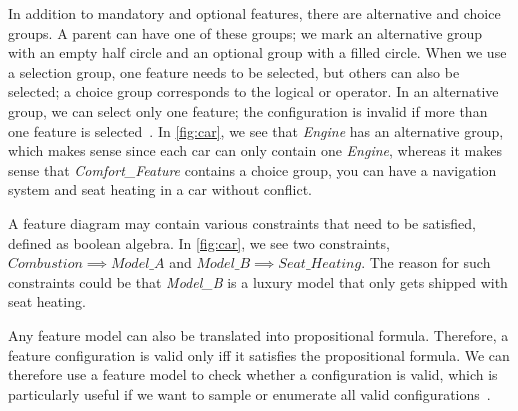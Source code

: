 In addition to mandatory and optional features, there are alternative and choice groups. 
A parent can have one of these groups; we mark an alternative group with an empty half circle and an optional group with a filled circle. 
When we use a selection group, one feature needs to be selected, but others can also be selected; a choice group corresponds to the logical or operator. 
In an alternative group, we can select only one feature; the configuration is invalid if more than one feature is selected~\cite{Feature-Oriented-Software-Product-Lines-Feature-models}. 
In \autoref{fig:car}, we see that \textit{Engine} has an alternative group, which makes sense since each car can only contain one \textit{Engine}, 
whereas it makes sense that \textit{Comfort\_Feature} contains a choice group, you can have a navigation system and seat heating in a car without conflict.

A feature diagram may contain various constraints that need to be satisfied, defined as boolean algebra. In \autoref{fig:car}, we see two constraints, 
$Combustion \implies Model\_A$ and $Model\_B \implies Seat\_Heating$. The reason for such constraints could be that \textit{Model\_B} 
is a luxury model that only gets shipped with seat heating.

Any feature model can also be translated into propositional formula. Therefore, a
feature configuration is valid only iff it satisfies the propositional formula. We can therefore use a feature model to check whether a configuration 
is valid, which is particularly useful if we want to sample or enumerate all valid configurations~\cite{Feature-Oriented-Software-Product-Lines-Feature-models}. 
